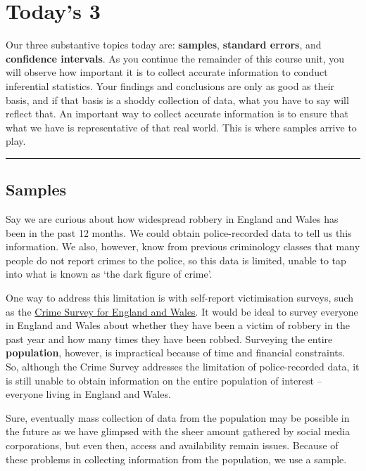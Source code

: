 \documentclass[
]{book}
\begin{document}
\hypertarget{todays-3-2}{%
\section{Today's 3}\label{todays-3-2}}

Our three substantive topics today are: \textbf{samples}, \textbf{standard errors}, and \textbf{confidence intervals}. As you continue the remainder of this course unit, you will observe how important it is to collect accurate information to conduct inferential statistics. Your findings and conclusions are only as good as their basis, and if that basis is a shoddy collection of data, what you have to say will reflect that. An important way to collect accurate information is to ensure that what we have is representative of that real world. This is where samples arrive to play.

\begin{center}\rule{0.5\linewidth}{0.5pt}\end{center}

\hypertarget{samples}{%
\subsection{Samples}\label{samples}}

Say we are curious about how widespread robbery in England and Wales has been in the past 12 months. We could obtain police-recorded data to tell us this information. We also, however, know from previous criminology classes that many people do not report crimes to the police, so this data is limited, unable to tap into what is known as `the dark figure of crime'.

One way to address this limitation is with self-report victimisation surveys, such as the \href{https://www.crimesurvey.co.uk/en/index.html}{Crime Survey for England and Wales}. It would be ideal to survey everyone in England and Wales about whether they have been a victim of robbery in the past year and how many times they have been robbed. Surveying the entire \textbf{population}, however, is impractical because of time and financial constraints. So, although the Crime Survey addresses the limitation of police-recorded data, it is still unable to obtain information on the entire population of interest -- everyone living in England and Wales.

Sure, eventually mass collection of data from the population may be possible in the future as we have glimpsed with the sheer amount gathered by social media corporations, but even then, access and availability remain issues. Because of these problems in collecting information from the population, we use a sample.
\end{document}
